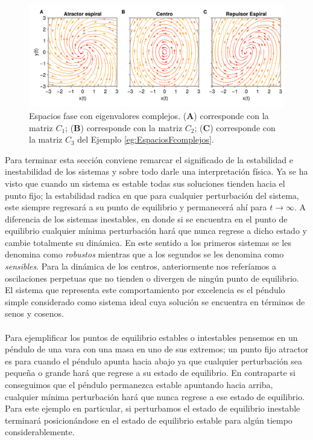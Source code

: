 \begin{ejemplo}
	\begin{figure}[h!]
		\centering
		\includegraphics[scale=0.23]{../../Imagenes/Espacios fase complejos}
		\caption{Espacios fase con eigenvalores complejos. (\textbf{A}) corresponde con la matriz $C_1$; (\textbf{B}) corresponde con la matriz $C_2$; (\textbf{C}) corresponde con la matriz $C_3$ del Ejemplo \ref{eg:EspaciosFcomplejos}.}
		\label{fig:EFComplejos}
	\end{figure}
\end{ejemplo}
Para terminar esta sección conviene remarcar el significado de la estabilidad e inestabilidad de los sistemas y sobre todo darle una interpretación física. Ya se ha visto que cuando un sistema es estable todas sus soluciones tienden hacia el punto fijo; la estabilidad radica en que para cualquier perturbación del sistema, este siempre regresará a su punto de equilibrio y permanecerá ahí para $t\to\infty$. A diferencia de los sistemas inestables, en donde si se encuentra en el punto de equilibrio cualquier mínima perturbación hará que nunca regrese a dicho estado y cambie totalmente su dinámica. En este sentido a los primeros sistemas se les denomina como \textit{robustos} mientras que a los segundos se les denomina como \textit{sensibles}. Para la dinámica de los centros, anteriormente nos referíamos a oscilaciones perpetuas que no tienden o divergen de ningún punto de equilibrio. El sistema que representa este comportamiento por excelencia es el péndulo simple considerado como sistema ideal cuya solución se encuentra en términos de senos y cosenos. \\
\\
Para ejemplificar los puntos de equilibrio estables o intestables pensemos en un péndulo de una vara con una masa en uno de sus extremos; un punto fijo atractor es para cuando el péndulo apunta hacia abajo ya que cualquier perturbación sea pequeña o grande hará que regrese a su estado de equilibrio. En contraparte si conseguimos que el péndulo permanezca estable apuntando hacia arriba, cualquier mínima perturbación hará que nunca regrese a ese estado de equilibrio. Para este ejemplo en particular, si perturbamos el estado de equilibrio inestable terminará posicionándose en el estado de equilibrio estable para algún tiempo considerablemente.


